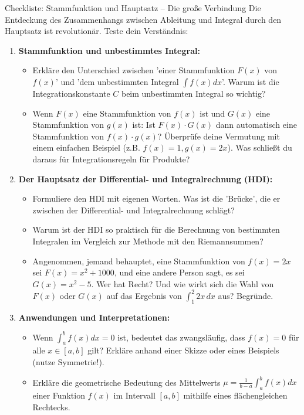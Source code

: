 \begin{aufgabenumgebung}{Checkliste: Stammfunktion und Hauptsatz – Die große Verbindung}
Die Entdeckung des Zusammenhangs zwischen Ableitung und Integral durch den Hauptsatz ist revolutionär. Teste dein Verständnis:

\begin{enumerate}[label=(\alph*)]
    \item \textbf{Stammfunktion und unbestimmtes Integral:}
    \begin{itemize}
        \item Erkläre den Unterschied zwischen 'einer Stammfunktion $F(x)$ von $f(x)$' und 'dem unbestimmten Integral $\int f(x)dx$'. Warum ist die Integrationskonstante $C$ beim unbestimmten Integral so wichtig?
        \item Wenn $F(x)$ eine Stammfunktion von $f(x)$ ist und $G(x)$ eine Stammfunktion von $g(x)$ ist: Ist $F(x) \cdot G(x)$ dann automatisch eine Stammfunktion von $f(x) \cdot g(x)$? Überprüfe deine Vermutung mit einem einfachen Beispiel (z.B. $f(x)=1, g(x)=2x$). Was schließt du daraus für Integrationsregeln für Produkte?
    \end{itemize}
    \item \textbf{Der Hauptsatz der Differential- und Integralrechnung (HDI):}
    \begin{itemize}
        \item Formuliere den HDI mit eigenen Worten. Was ist die 'Brücke', die er zwischen der Differential- und Integralrechnung schlägt?
        \item Warum ist der HDI so praktisch für die Berechnung von bestimmten Integralen im Vergleich zur Methode mit den Riemannsummen?
        \item Angenommen, jemand behauptet, eine Stammfunktion von $f(x)=2x$ sei $F(x)=x^2+1000$, und eine andere Person sagt, es sei $G(x)=x^2-5$. Wer hat Recht? Und wie wirkt sich die Wahl von $F(x)$ oder $G(x)$ auf das Ergebnis von $\int_1^2 2x \,dx$ aus? Begründe.
    \end{itemize}
    \item \textbf{Anwendungen und Interpretationen:}
    \begin{itemize}
        \item Wenn $\int_a^b f(x)dx = 0$ ist, bedeutet das zwangsläufig, dass $f(x)=0$ für alle $x \in [a,b]$ gilt? Erkläre anhand einer Skizze oder eines Beispiels (nutze Symmetrie!).
        \item Erkläre die geometrische Bedeutung des Mittelwerts $\mu = \frac{1}{b-a} \int_a^b f(x)dx$ einer Funktion $f(x)$ im Intervall $[a,b]$ mithilfe eines flächengleichen Rechtecks.
    \end{itemize}
\end{enumerate}
\end{aufgabenumgebung}

